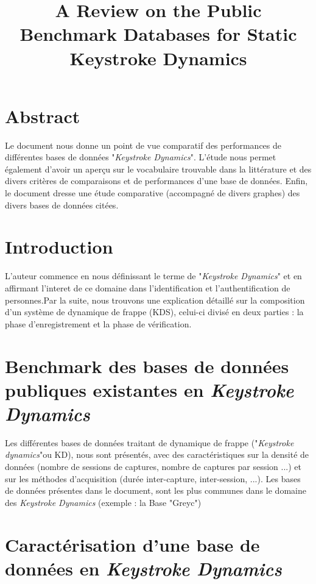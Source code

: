 \documentclass[a4paper,11pt]{article}
\begin{document}
\title{A Review on the Public Benchmark Databases for Static Keystroke Dynamics\cite{giotBenchmark}}
\maketitle

\section{Abstract}

Le document nous donne un point de vue comparatif des performances de différentes bases de données "\textit{Keystroke Dynamics}".    
L'étude nous permet également d'avoir un aperçu sur le vocabulaire trouvable dans la littérature et des divers critères de comparaisons et de performances d'une base de données.
Enfin, le document dresse une étude comparative (accompagné de divers graphes) des divers bases de données citées.

\section{Introduction}

L'auteur commence en nous définissant le terme de "\textit{Keystroke Dynamics}" et en affirmant l'interet de ce domaine dans l'identification et l'authentification de personnes.Par la suite, nous trouvons une explication détaillé sur la composition d'un système de dynamique de frappe (KDS), celui-ci divisé en deux parties : la phase d'enregistrement et la phase de vérification.

\section{Benchmark des bases de données publiques existantes en \textit{Keystroke Dynamics}}

Les différentes bases de données traitant de dynamique de frappe ("\textit{Keystroke dynamics}"ou  KD), nous sont présentés, avec des caractéristiques sur la densité de données (nombre de sessions de captures, nombre de captures par session ...) et sur les méthodes d'acquisition (durée inter-capture, inter-session, ...).  Les bases de données présentes dans le document, sont les plus communes dans le domaine des \textit{Keystroke Dynamics} (exemple : la Base "Greyc")

\section{Caractérisation d'une base de données en \textit{Keystroke Dynamics}}
\end{document}
